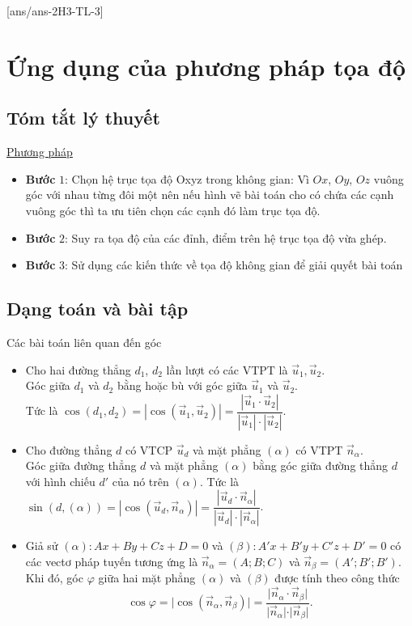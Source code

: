 [ans/ans-2H3-TL-3]
\setcounter{dang}{0}
\setcounter{vd}{0}
\section{Ứng dụng của phương pháp tọa độ}
\subsection{Tóm tắt lý thuyết}
\begin{tomtat}
\underline{Phương pháp}
	\begin{itemize}
		\item \textbf{Bước} $1$: Chọn hệ trục tọa độ Oxyz trong không gian: Vì $Ox$, $Oy$, $Oz$ vuông góc với nhau từng đôi một nên nếu hình vẽ bài toán cho có chứa các cạnh vuông góc thì ta ưu tiên chọn các cạnh đó	làm trục tọa độ.
		\item \textbf{Bước} $2$: Suy ra tọa độ của các đỉnh, điểm trên hệ trục tọa độ vừa ghép.
		\item  \textbf{Bước} $3$: Sử dụng các kiến thức về tọa độ không gian để giải quyết bài toán
	\end{itemize}
\end{tomtat}
\subsection{Dạng toán và bài tập}
\begin{dang}{Các bài toán liên quan đến góc}
	\begin{itemize}
		\item Cho hai đường thẳng $d_1$, $d_2$ lần lượt có các VTPT là $\vec{u}_1,\vec{u}_2$.\\
		Góc giữa $d_1$ và $d_2$ bằng hoặc bù với góc giữa $\vec{u}_1$ và $\vec{u}_2$.\\
		Tức là $\cos (d_1,d_2 )=\left| \cos (\vec{u}_1,\vec{u}_2 ) \right|=\dfrac{\left| \vec{u}_1\cdot\vec{u}_2 \right|}{\left| \vec{u}_1 \right|\cdot\left| \vec{u}_2 \right|}$.
		\item Cho đường thẳng $d$ có VTCP $\vec{u}_d$ và mặt phẳng $(\alpha)$ có VTPT $\vec{n}_\alpha$.\\
		Góc giữa đường thẳng $d$ và mặt phẳng $(\alpha)$ bằng góc giữa đường thẳng $d$ với hình chiếu $d'$ của nó trên $(\alpha)$. Tức là $\sin (d,(\alpha ) )=\left| \cos (\vec{u}_d,\vec{n}_\alpha ) \right|=\dfrac{\left| \vec{u}_d\cdot\vec{n}_\alpha \right|}{\left| \vec{u}_d \right|\cdot\left| \vec{n}_\alpha \right|}$.
		\item Giả sử $(\alpha):Ax+By+Cz+D=0$ và $(\beta): A'x+B'y+C'z+D'=0$ có các vectơ pháp tuyến tương ứng là $\vec{n}_{\alpha}=(A;B;C)$ và $\vec{n}_{\beta}=(A';B';B')$. Khi đó, góc $\varphi$ giữa hai mặt phẳng $(\alpha)$ và $(\beta)$ được tính theo công thức
		$$\cos\varphi=\vert \cos(\vec{n}_{\alpha},\vec{n}_{\beta})\vert=\dfrac{\vert\vec{n}_{\alpha}\cdot\vec{n}_{\beta}\vert}{\vert\vec{n}_{\alpha}\vert\cdot\vert\vec{n}_{\beta}\vert}.$$
	\end{itemize}
\end{dang}
\noindent
